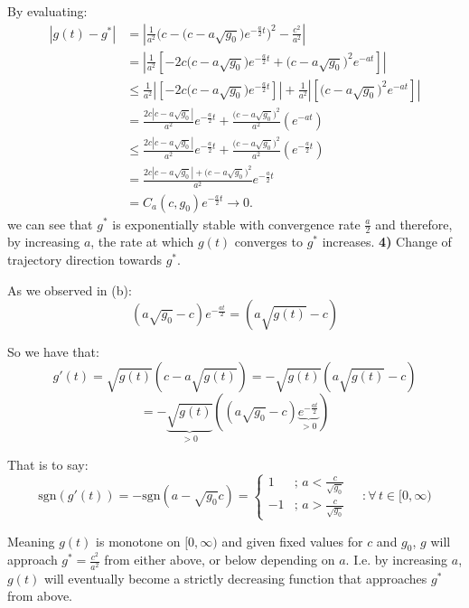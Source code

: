 \documentclass[]{article}
\newcommand{\sgn}{\text{sgn}}
\begin{document}
By evaluating:
\begin{align*}
|\displaystyle g(t)-g^{*}|
&=\left|\frac{1}{a^{2}}\Big(c-\big(c-a\sqrt{g_{0}}\big)e^{-\frac{a}{2}t}\Big)^{2}-\frac{c^{2}}{a^{2}} \right|\\[2pt]
&=\left|\frac{1}{a^{2}}\left[-2c\big(c-a\sqrt{g_{0}}\big)e^{-\frac{a}{2}t}+\big(c-a\sqrt{g_{0}}\big)^{2}e^{-a t}\right]\right| \\[2pt]
& \leq \frac{1}{a^{2}}\left|\left[-2c\big(c-a\sqrt{g_{0}}\big)e^{-\frac{a}{2}t} \right] \right| + \frac{1}{a^{2}}\left| \left[\big(c-a\sqrt{g_{0}}\big)^{2}e^{-a t}\right]\right| \\[2pt]
&= \frac{2c\left|c-a\sqrt{g_{0}}\right|}{a^{2}}e^{-\frac{a}{2}t} + \frac{\big(c-a\sqrt{g_{0}}\big)^{2}}{a^{2}}\left( e^{-a t}\right) \\[2pt]
& \leq \frac{2c\left|c-a\sqrt{g_{0}}\right|}{a^{2}}e^{-\frac{a}{2}t} + \frac{\big(c-a\sqrt{g_{0}}\big)^{2}}{a^{2}}\left(e^{-\frac{a}{2}t}\right) \\[2pt]
& = \frac{2c\left|c-a\sqrt{g_{0}}\right| + \big(c-a\sqrt{g_{0}}\big)^{2}}{a^{2}}e^{-\frac{a}{2}t} \\[2pt]
& =C_a(c,g_0) e^{-\frac{a}{2}t} \to 0.
\end{align*}
\indent we can see that $g^*$ is exponentially stable with convergence rate $\frac{a}{2}$ and \indent therefore, by increasing $a$, the rate at which $g(t)$ converges to $g^*$ increases.\newline
\linebreak
\noindent\textbf{4)} Change of trajectory direction towards $g^*$.\newline

As we observed in (b):
\[
\left(a \sqrt{g_0}-c\right)e^{-\frac{at}{2}} = \left(a \sqrt{g(t)}-c\right)
\]

So we have that:
\[
g'(t) = \sqrt{g(t)}\left(c-a\sqrt{g(t)}\right) = -\sqrt{g(t)}\left(a\sqrt{g(t)}-c\right) 
\]
\[= -\underbrace{\sqrt{g(t)}}_{>0}\left(\left(a \sqrt{g_0}-c\right)\underbrace{e^{-\frac{at}{2}}}_{>0} \right)\]

That is to say:
\[
\sgn\left(g'(t)\right) = -\sgn\left(a-\sqrt{g_0} c\right) = \begin{cases}
    1 & ;\, a < \frac{c}{\sqrt{g_0}} \\
    -1 & ;\, a > \frac{c}{\sqrt{g_0}}
\end{cases} \quad : \forall \, t \in [0,\infty)
\]

Meaning $g(t)$ is monotone on $[0,\infty)$ and given fixed values for $c$ and $g_0$, $g$ \indent will approach $g^* = \frac{c^2}{a^2}$ from either above, or below depending on $a$. I.e. by \indent increasing $a$, $g(t)$ will eventually become a strictly decreasing function that \indent approaches $g^*$ from above.\newline
\end{document}
